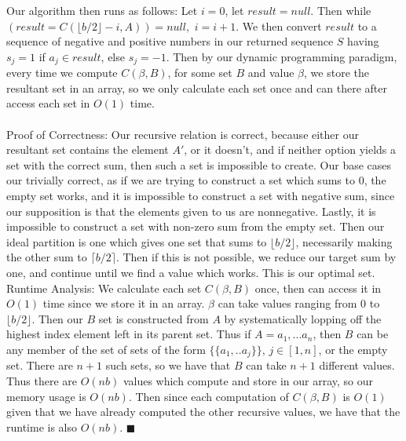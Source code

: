 \documentclass[10.5pt,letter]{article}
\begin{document}
 Our algorithm then runs as follows: Let $i =0$, let $result = null$. Then while $(result = C(\lfloor b/2\rfloor - i, A)) = null,$ $i = i + 1$. We then convert $result$ to a sequence of negative and positive numbers in our returned sequence $S$ having $s_j = 1$ if $a_j \in result$, else $s_j = -1$. Then by our dynamic programming paradigm, every time we compute $C(\beta, B)$, for some set $B$ and value $\beta$, we store the resultant set in an array, so we only calculate each set once and can there after access each set in $O(1)$ time. \\ \\
Proof of Correctness: Our recursive relation is correct, because either our resultant set contains the element $A'$, or it doesn't, and if neither option yields a set with the correct sum, then such a set is impossible to create. Our base cases our trivially correct, as if we are trying to construct a set which sums to $0$, the empty set works, and it is impossible to construct a set with negative sum, since our supposition is that the elements given to us are nonnegative. Lastly, it is impossible to construct a set with non-zero sum from the empty set. Then our ideal partition is one which gives one set that sums to $\lfloor b/2 \rfloor$, necessarily making the other sum to $\lceil b/2 \rceil$. Then if this is not possible, we reduce our target sum by one, and continue until we find a value which works. This is our optimal set.
Runtime Analysis: We calculate each set $C(\beta, B)$ once, then can access it in $O(1)$ time since we store it in an array. $\beta$ can take values ranging from $0$ to $\lfloor b/2\rfloor$. Then our $B$ set is constructed from $A$ by systematically lopping off the highest index element left in its parent set. Thus if $A= a_1, ... a_n$, then $B$ can be any member of the set of sets of the form $\{ \{ a_1, .. a_j\} \}$, $j \in [1, n]$, or the empty set. There are $n+1$ such sets, so we have that $B$ can take $n+1$ different values. Thus there are $O(nb)$ values which compute and store in our array, so our memory usage is $O(nb)$. Then since each computation of $C(\beta, B)$ is $O(1)$ given that we have already computed the other recursive values, we have that the runtime is also $O(nb)$. $\blacksquare$
\end{document}
